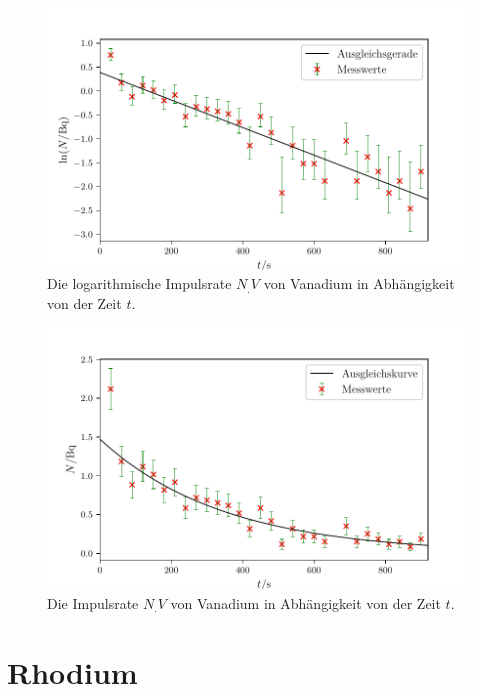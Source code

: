 \begin{figure}
	\centering
	\includegraphics[width=\linewidth-50pt,height=\textheight-50pt,keepaspectratio]{content/images/VanadiumLog.pdf}
	\caption{Die logarithmische Impulsrate $N_.V$ von Vanadium in Abhängigkeit von der Zeit $t$.}
	\label{fig:VanadiumLog}
\end{figure}

\begin{figure}
	\centering
	\includegraphics[width=\linewidth-50pt,height=\textheight-50pt,keepaspectratio]{content/images/Vanadium.pdf}
	\caption{Die Impulsrate $N_.V$ von Vanadium in Abhängigkeit von der Zeit $t$.}
	\label{fig:Vanadium}
\end{figure}


\section{Rhodium}

